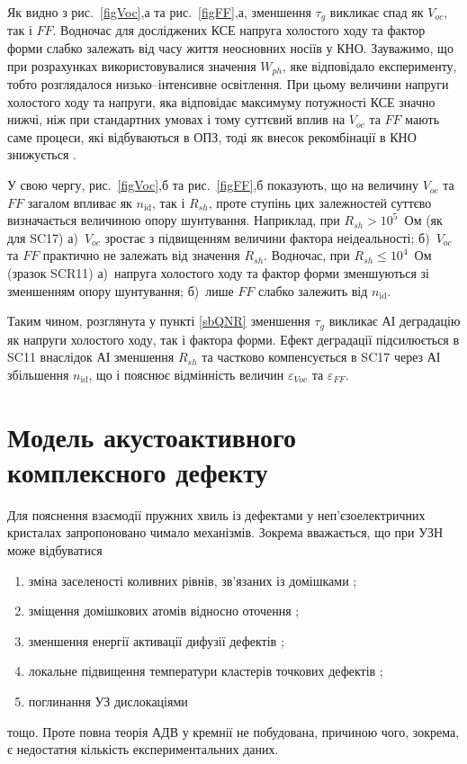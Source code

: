 Як видно з рис.~\ref{figVoc},а та рис.~\ref{figFF},а, зменшення $\tau_g$ викликає спад як $V_{oc}$, так і $F\!F$.
Водночас для досліджених КСЕ напруга холостого ходу та фактор форми слабко залежать від
часу життя неосновних носіїв у КНО.
Зауважимо, що при розрахунках використовувалися значення $W_{ph}$, яке відповідало експерименту,
тобто розглядалося низько--інтенсивне освітлення.
При цьому величини напруги холостого ходу та напруги, яка відповідає максимуму потужності КСЕ значно нижчі,
ніж при стандартних умовах і тому суттєвий вплив на $V_{oc}$ та $F\!F$ мають саме процеси, які відбуваються
в ОПЗ, тоді як внесок рекомбінації в КНО знижується \cite{Breitenstein2013}.

У свою чергу, рис.~\ref{figVoc},б та рис.~\ref{figFF},б показують,
що на величину $V_{oc}$ та $F\!F$ загалом впливає як $n_\mathrm{id}$, так і $R_{sh}$,
проте ступінь цих залежностей суттєво визначається величиною  опору шунтування.
Наприклад, при $R_{sh}>10^5$~Ом (як для SC17)
а)~$V_{oc}$ зростає з підвищенням величини фактора неідеальності;
б)~$V_{oc}$ та $FF$ практично не залежать від значення $R_{sh}$.
Водночас, при $R_{sh}\leq10^4$~Ом (зразок SCR11)
а)~напруга холостого ходу та фактор форми зменшуються зі зменшенням  опору шунтування;
б)~лише $F\!F$ слабко залежить від $n_\mathrm{id}$.

Таким чином, розглянута у пункті \ref{sbQNR} зменшення $\tau_g$ викликає АІ деградацію як напруги
холостого ходу, так і фактора форми.
Ефект деградації підсилюється в SC11 внаслідок АІ зменшення $R_{sh}$ та частково компенсується в SC17
через АІ збільшення $n_\mathrm{id}$, що і пояснює відмінність величин $\varepsilon_{Voc}$ та $\varepsilon_{FF}$.



\section{Модель акустоактивного комплексного дефекту\label{sbAEDefect}}

Для пояснення взаємодії пружних хвиль із дефектами у неп'єзоелектричних кристалах
запропоновано чимало механізмів.
Зокрема вважається, що при УЗН може відбуватися
\begin{enumerate}[label=\asbuk*),leftmargin=0em,itemindent=1.5em]
\item зміна заселеності коливних рівнів, зв'язаних із домішками \cite{Pavlovich};
\item зміщення домішкових атомів відносно оточення \cite{Korotchenkov1995,MirzadeR,MirzadeJAP2011,PELESHCHAK:UPJ2016};
\item зменшення енергії активації дифузії дефектів \cite{Krevchik};
\item локальне підвищення температури кластерів точкових дефектів  \cite{MirzadeJAP2005};
\item поглинання УЗ дислокаціями \cite{Davletova2008,OstrovKor92}
\end{enumerate}
тощо.
Проте повна теорія АДВ у кремнії не побудована, причиною чого, зокрема, є недостатня
кількість експериментальних даних.

